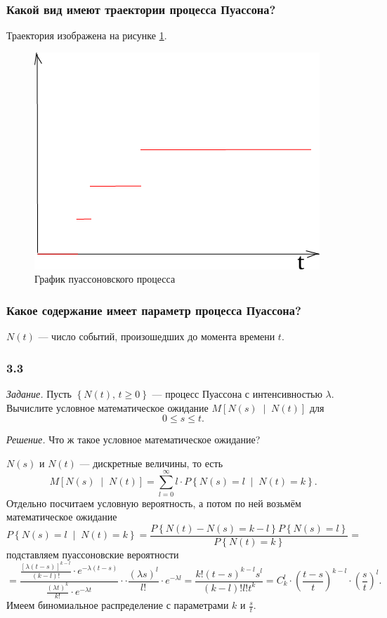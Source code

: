 \subsubsection*{Какой вид имеют траектории процесса Пуассона?}

Траектория изображена на рисунке \ref{fig:3}.

\begin{figure}[h!]
  \centering
  \includegraphics[width=.4\textwidth]{./pictures/3.png}
  \caption{График пуассоновского процесса}
  \label{fig:3}
\end{figure}

\subsubsection*{Какое содержание имеет параметр процесса Пуассона?}

$N \left( t \right) $ --- число событий, произошедших до момента времени $t$.

\subsubsection*{3.3}

\textit{Задание.}
Пусть $ \left\{ N \left( t \right), \, t \geq 0 \right\} $ ---
процесс Пуассона с интенсивностью $ \lambda $.
Вычислите условное математическое ожидание
$M \left[ N \left( s \right) \; \middle| \; N \left( t \right) \right] $ для
$$0 \leq s \leq t.$$

\textit{Решение.}
Что ж такое условное математическое ожидание?

$N \left( s \right) $ и $N \left( t \right) $ --- дискретные величины, то есть
$$M \left[ N \left( s \right) \; \middle| \; N \left( t \right) \right] =
  \sum \limits_{l = 0}^{ \infty }
    l \cdot P \left\{ N \left( s \right) = l \; \middle| \; N \left( t \right) = k \right\}.$$
Отдельно посчитаем условную вероятность, а потом по ней возьмём математическое ожидание
$$P \left\{ N \left( s \right) = l \; \middle| \; N \left( t \right) = k \right\} =
  \frac{P \left\{ N \left( t \right) - N \left( s \right) = k - l \right\} P \left\{ N \left( s \right) = l \right\} }{P \left\{ N \left( t \right) = k \right\} } =$$
подставляем пуассоновские вероятности
$$= \frac{ \frac{ \left[ \lambda \left( t - s \right) \right]^{k - l}}{ \left( k - l \right)!} \cdot e^{-\lambda \left( t - s \right) }}{ \frac{ \left( \lambda t \right)^k}{k!} \cdot e^{-\lambda t}} \cdot
  \cdot \frac{ \left( \lambda s \right)^l}{l!} \cdot e^{-\lambda l} =
  \frac{k! \left( t - s \right)^{k - l} s^l}{ \left( k - l \right)! l! t^k} =
  C_k^l \cdot \left( \frac{t - s}{t} \right)^{k - l} \cdot \left( \frac{s}{t} \right)^l.$$
Имеем биномиальное распределение с параметрами $k$ и $ \frac{s}{t}$.

